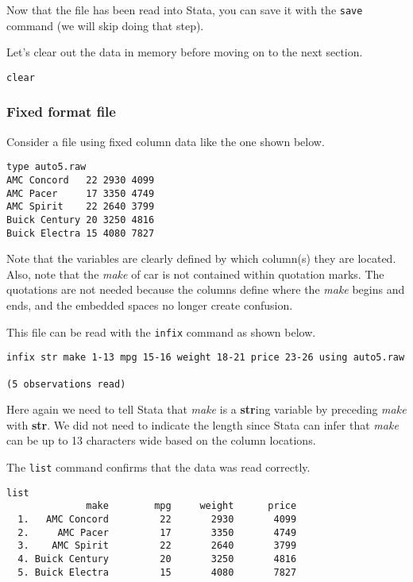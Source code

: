 Now that the file has been read into Stata, you can save it with the \lstinline{save} command (we will skip doing that step).

Let's clear out the data in memory before moving on to the next section.

\begin{lstlisting}
clear
\end{lstlisting}

\subsubsection{Fixed format file}

Consider a file using fixed column data like the one shown below.

\begin{lstlisting}
type auto5.raw
AMC Concord   22 2930 4099
AMC Pacer     17 3350 4749
AMC Spirit    22 2640 3799
Buick Century 20 3250 4816
Buick Electra 15 4080 7827
\end{lstlisting}

Note that the variables are clearly defined by which column(s) they are located. Also, note that the \textit{make} of car is not contained within quotation marks. The quotations are not needed because the columns define where the \textit{make} begins and ends, and the embedded spaces no longer create confusion.

This file can be read with the \lstinline{infix} command as shown below.

\begin{lstlisting}
infix str make 1-13 mpg 15-16 weight 18-21 price 23-26 using auto5.raw

(5 observations read)
\end{lstlisting}

Here again we need to tell Stata that \textit{make} is a \textbf{str}ing variable by preceding \textit{make} with \textbf{str}. We did not need to indicate the length since Stata can infer that \textit{make} can be up to 13 characters wide based on the column locations.

The \lstinline{list} command confirms that the data was read correctly.

\begin{lstlisting}
list
              make        mpg     weight      price
  1.   AMC Concord         22       2930       4099
  2.     AMC Pacer         17       3350       4749
  3.    AMC Spirit         22       2640       3799
  4. Buick Century         20       3250       4816
  5. Buick Electra         15       4080       7827
\end{lstlisting}

